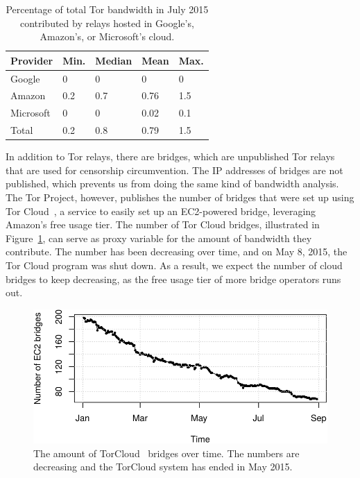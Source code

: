 \begin{table}[t]
	\centering
	\begin{tabular}{lllll}
	\textbf{Provider} & \textbf{Min.} & \textbf{Median} & \textbf{Mean} & \textbf{Max.} \\
	\hline
	Google & 0 & 0 & 0 & 0 \\
	Amazon & 0.2 & 0.7 & 0.76 & 1.5 \\
	Microsoft & 0 & 0 & 0.02 & 0.1 \\
	\hline
	Total & 0.2 & 0.8 & 0.79 & 1.5 \\
	\end{tabular}
	\caption{Percentage of total Tor bandwidth in July 2015 contributed by
	relays hosted in Google's, Amazon's, or Microsoft's cloud.}
	\label{tab:bwfraction}
\end{table}

In addition to Tor relays, there are bridges, which are unpublished Tor relays
that are used for censorship circumvention.  The IP addresses of bridges are
not published, which prevents us from doing the same kind of bandwidth
analysis.  The Tor Project, however, publishes the number of bridges that were
set up using Tor Cloud~\cite{torcloud}, a service to easily set up an
EC2-powered bridge, leveraging Amazon's free usage tier.  The number of Tor
Cloud bridges, illustrated in Figure~\ref{fig:cloudbridges}, can serve as proxy
variable for the amount of bandwidth they contribute.  The number has been
decreasing over time, and on May 8, 2015, the Tor Cloud program was shut down.
As a result, we expect the number of cloud bridges to keep decreasing, as the
free usage tier of more bridge operators runs out.

\begin{figure}[t]
	\centering
	\includegraphics[width=\linewidth]{diagrams/torcloud.pdf}
	\caption{The amount of TorCloud~\cite{torcloud} bridges over time.  The
	numbers are decreasing and the TorCloud system has ended in May 2015.}
	\label{fig:cloudbridges}
\end{figure}
